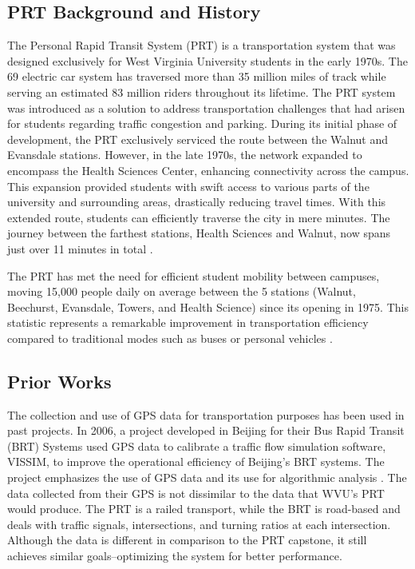 \subsection{PRT Background and History}
The Personal Rapid Transit System (PRT) is a transportation system that was designed exclusively for West Virginia University students in the early 1970s. The 69 electric car system has traversed more than 35 million miles of track while serving an estimated 83 million riders throughout its lifetime. The PRT system was introduced as a solution to address transportation challenges that had arisen for students regarding traffic congestion and parking. During its initial phase of development, the PRT exclusively serviced the route between the Walnut and Evansdale stations. However, in the late 1970s, the network expanded to encompass the Health Sciences Center, enhancing connectivity across the campus. This expansion provided students with swift access to various parts of the university and surrounding areas, drastically reducing travel times. With this extended route, students can efficiently traverse the city in mere minutes. The journey between the farthest stations, Health Sciences and Walnut, now spans just over 11 minutes in total \cite{about-prt}.

The PRT has met the need for efficient student mobility between campuses, moving 15,000 people daily on average between the 5 stations (Walnut, Beechurst, Evansdale, Towers, and Health Science) since its opening in 1975. This statistic represents a remarkable improvement in transportation efficiency compared to traditional modes such as buses or personal vehicles \cite{about-prt}.

\subsection{Prior Works}
The collection and use of GPS data for transportation purposes has been used in past projects. In 2006, a project developed in Beijing for their Bus Rapid Transit (BRT) Systems used GPS data to calibrate a traffic flow simulation software, VISSIM, to improve the operational efficiency of Beijing’s BRT systems. The project emphasizes the use of GPS data and its use for algorithmic analysis \cite{Yu_Yu_Chen_Wan_Guo_2006}. The data collected from their GPS is not dissimilar to the data that WVU’s PRT would produce. The PRT is a railed transport, while the BRT is road-based and deals with traffic signals, intersections, and turning ratios at each intersection. Although the data is different in comparison to the PRT capstone, it still achieves similar goals–optimizing the system for better performance.

